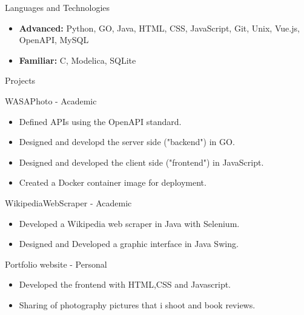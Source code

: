 \documentclass[]{mcdowellcv}
\begin{document}
\begin{cvsection}{Languages and Technologies}
		\begin{cvsubsection}{}{}{}	
			\begin{itemize}
				\item \textbf{Advanced:} Python, GO, Java, HTML, CSS, JavaScript, Git, Unix, Vue.js, OpenAPI, MySQL
				\item \textbf{Familiar:} C, Modelica, SQLite
			\end{itemize}
		\end{cvsubsection}
	\end{cvsection}
	
	\begin{cvsection}{Projects}
		\begin{cvsubsection}{WASAPhoto - Academic}{}{}
			\begin{itemize}
            	\item Defined APIs using the OpenAPI standard.
            	\item Designed and developd the server side ("backend") in GO.
            	\item Designed and developed the client side ("frontend") in JavaScript.
            	\item Created a Docker container image for deployment.
			\end{itemize}
		\end{cvsubsection}

		\begin{cvsubsection}{WikipediaWebScraper - Academic}{}{}
			\begin{itemize}
            	\item Developed a Wikipedia web scraper in Java with Selenium.
            	\item Designed and Developed a graphic interface in Java Swing.
			\end{itemize}
		\end{cvsubsection}


		\begin{cvsubsection}{Portfolio website - Personal}{}{}
			\begin{itemize}
            	\item Developed the frontend with HTML,CSS and Javascript.
            	\item Sharing of photography pictures that i shoot and book reviews.
			\end{itemize}
		\end{cvsubsection}
	\end{cvsection}
\end{document}
